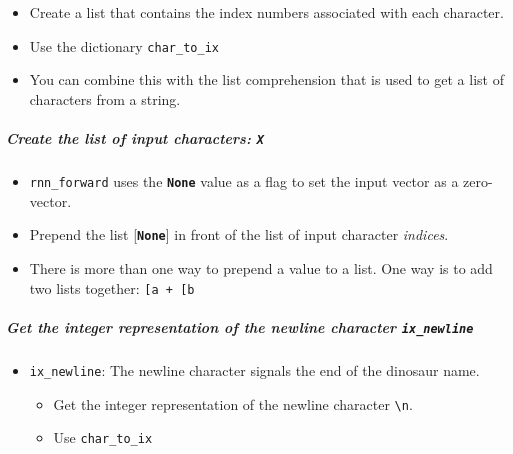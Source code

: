 \documentclass[11pt]{article}
\providecommand{\tightlist}{%
      \setlength{\itemsep}{0pt}\setlength{\parskip}{0pt}}
\begin{document}
\begin{itemize}
\tightlist
\item
  Create a list that contains the index numbers associated with each
  character.
\item
  Use the dictionary \texttt{char\_to\_ix}
\item
  You can combine this with the list comprehension that is used to get a
  list of characters from a string.
\end{itemize}

    \hypertarget{create-the-list-of-input-characters-x}{%
\subparagraph{\texorpdfstring{Create the list of input characters:
\texttt{X}}{Create the list of input characters: X}}\label{create-the-list-of-input-characters-x}}

\begin{itemize}
\tightlist
\item
  \texttt{rnn\_forward} uses the \textbf{\texttt{None}} value as a flag
  to set the input vector as a zero-vector.
\item
  Prepend the list {[}\textbf{\texttt{None}}{]} in front of the list of
  input character \emph{indices}.
\item
  There is more than one way to prepend a value to a list. One way is to
  add two lists together:
  \texttt{{[}\textquotesingle{}a\textquotesingle{}{]}\ +\ {[}\textquotesingle{}b\textquotesingle{}{]}}
\end{itemize}

    \hypertarget{get-the-integer-representation-of-the-newline-character-ix_newline}{%
\subparagraph{\texorpdfstring{Get the integer representation of the
newline character
\texttt{ix\_newline}}{Get the integer representation of the newline character ix\_newline}}\label{get-the-integer-representation-of-the-newline-character-ix_newline}}

\begin{itemize}
\tightlist
\item
  \texttt{ix\_newline}: The newline character signals the end of the
  dinosaur name.

  \begin{itemize}
  \tightlist
  \item
    Get the integer representation of the newline character
    \texttt{\textquotesingle{}\textbackslash{}n\textquotesingle{}}.
  \item
    Use \texttt{char\_to\_ix}
  \end{itemize}
\end{itemize}
\end{document}
